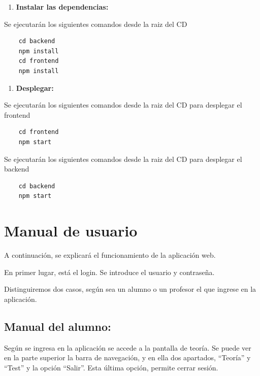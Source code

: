\documentclass[openright,twoside,10pt]{book}
\providecommand{\tightlist}{%
  \setlength{\itemsep}{0pt}\setlength{\parskip}{0pt}}
\begin{document}
    \begin{enumerate}
    \def\labelenumi{\arabic{enumi}.}
    \setcounter{enumi}{1}
    \tightlist
    \item
      \textbf{Instalar las dependencias:}
    \end{enumerate}
    
    Se ejecutarán los siguientes comandos desde la raiz del CD
    
    \begin{verbatim}
    cd backend
    npm install
    cd frontend
    npm install
    \end{verbatim}
    
    \begin{enumerate}
    \def\labelenumi{\arabic{enumi}.}
    \setcounter{enumi}{2}
    \tightlist
    \item
      \textbf{Desplegar:}
    \end{enumerate}
    
    Se ejecutarán los siguientes comandos desde la raiz del CD para
    desplegar el frontend
    
    \begin{verbatim}
    cd frontend
    npm start
    \end{verbatim}
    
    Se ejecutarán los siguientes comandos desde la raiz del CD para
    desplegar el backend
    
    \begin{verbatim}
    cd backend
    npm start
    \end{verbatim}
    
    \chapter{ Manual de usuario }
    
    A continuación, se explicará el funcionamiento de la aplicación web.
    
    En primer lugar, está el login. Se introduce el usuario y contraseña.
    
    Distinguiremos dos casos, según sea un alumno o un profesor el que
    ingrese en la aplicación.
    
    \section{Manual del alumno:}\label{manual-del-alumno}
    
    Según se ingresa en la aplicación se accede a la pantalla de teoría. Se
    puede ver en la parte superior la barra de navegación, y en ella dos
    apartados, \enquote{Teoría} y \enquote{Test} y la opción
    \enquote{Salir}. Esta última opción, permite cerrar sesión.
    
\end{document}
